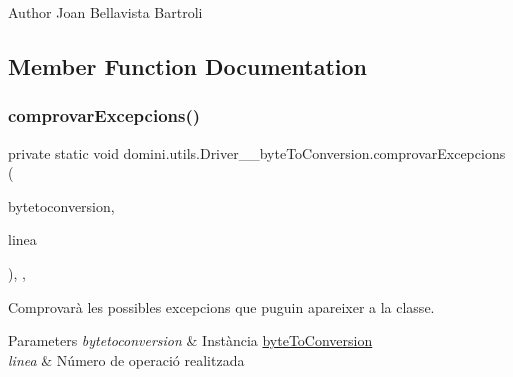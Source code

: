 \begin{DoxyAuthor}{Author}
Joan Bellavista Bartroli 
\end{DoxyAuthor}


\subsection{Member Function Documentation}
\mbox{\label{classdomini_1_1utils_1_1Driver____byteToConversion_a82c589da57bedb139b9254c8623a7fd4}} 
\subsubsection{\texorpdfstring{comprovar\+Excepcions()}{comprovarExcepcions()}}
{\footnotesize\ttfamily private static void domini.\+utils.\+Driver\+\_\+\+\_\+byte\+To\+Conversion.\+comprovar\+Excepcions (\begin{DoxyParamCaption}\item[{\hyperlink{classdomini_1_1utils_1_1byteToConversion}{byte\+To\+Conversion}}]{bytetoconversion,  }\item[{String}]{linea }\end{DoxyParamCaption})\hspace{0.3cm}{\ttfamily [inline]}, {\ttfamily [static]}, {\ttfamily [private]}}



Comprovarà les possibles excepcions que puguin apareixer a la classe. 


\begin{DoxyParams}{Parameters}
{\em bytetoconversion} & Instància \hyperlink{classdomini_1_1utils_1_1byteToConversion}{byte\+To\+Conversion} \\
\hline
{\em linea} & Número de operació realitzada \\
\hline
\end{DoxyParams}
\mbox{\label{classdomini_1_1utils_1_1Driver____byteToConversion_a19510acac17ad211538d878b4de039b8}} 
